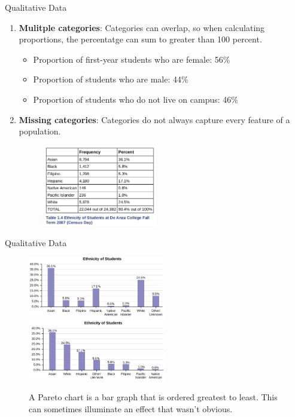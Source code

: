 \documentclass{beamer}
\begin{document}
\begin{frame}{Qualitative Data}
\begin{enumerate}
\item \textbf{Mulitple categories}: Categories can overlap, so when calculating proportions, the percentatge can sum to greater than 100 percent.
\begin{itemize}
\item Proportion of first-year students who are female: 56\%
\item Proportion of students who are male: 44\%
\item Proportion of students who do not live on campus: 46\%
\end{itemize}
\item \textbf{Missing categories}: Categories do not always capture every feature of a population.
\begin{figure}
\centering
\includegraphics[width=5cm]{figures/race.png}
\end{figure}
\end{enumerate}
\end{frame}

\begin{frame}{Qualitative Data}
\begin{figure}
\centering
\includegraphics[width=6cm]{figures/race2.png}
\includegraphics[width=6cm]{figures/race3.png}
\caption{\label{fig:pareto} A Pareto chart is a bar graph that is ordered greatest to least.  This can sometimes illuminate an effect that wasn't obvious.}
\end{figure}
\end{frame}
\end{document}
